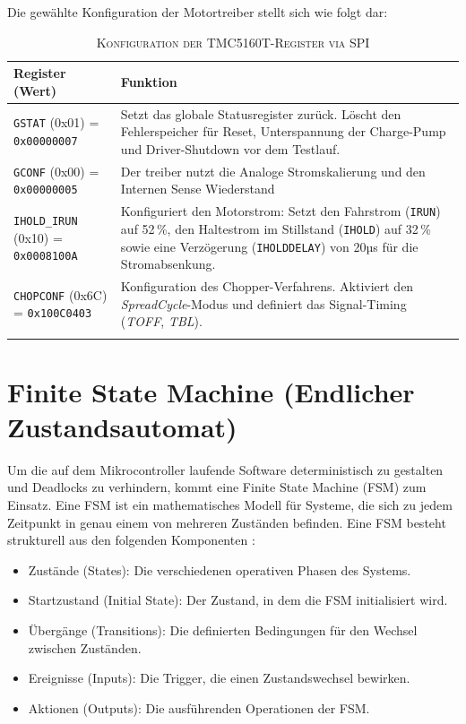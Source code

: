 Die gewählte Konfiguration der Motortreiber stellt sich wie folgt dar:

\begin{table}[htbp]
	\footnotesize 
	\centering
	\caption[Konfiguration der TMC5160T-Register via SPI]{\textsc{Konfiguration der TMC5160T-Register via SPI}}
	\label{tab:tmc5160_config}
	
	\begin{tabularx}{\linewidth}{l X}
		\toprule
		\textbf{Register (Wert)} & \textbf{Funktion} \\
		\midrule
		\texttt{GSTAT} (0x01) = \texttt{0x00000007} & Setzt das globale Statusregister zurück. Löscht den Fehlerspeicher für Reset, Unterspannung der Charge-Pump und Driver-Shutdown vor dem Testlauf. \\
		\addlinespace
		\texttt{GCONF} (0x00) = \texttt{0x00000005} & Der treiber nutzt die Analoge Stromskalierung und den Internen Sense Wiederstand \\
		\addlinespace
		\texttt{IHOLD\_IRUN} (0x10) = \texttt{0x0008100A} & Konfiguriert den Motorstrom: Setzt den Fahrstrom (\texttt{IRUN}) auf 52\,\%, den Haltestrom im Stillstand (\texttt{IHOLD}) auf 32\,\% sowie eine Verzögerung (\texttt{IHOLDDELAY}) von 20µs für die Stromabsenkung. \\
		\addlinespace
		\texttt{CHOPCONF} (0x6C) = \texttt{0x100C0403} & Konfiguration des Chopper-Verfahrens. Aktiviert den \textit{SpreadCycle}-Modus und definiert das Signal-Timing (\textit{TOFF}, \textit{TBL}). \\
		\bottomrule \cite{power}
	\end{tabularx}
\end{table}

\section{Finite State Machine (Endlicher Zustandsautomat)}
\label{subsec:fsm}

Um die auf dem Mikrocontroller laufende Software deterministisch zu gestalten und Deadlocks zu verhindern, kommt eine Finite State Machine (FSM) zum Einsatz. Eine FSM ist ein mathematisches Modell für Systeme, die sich zu jedem Zeitpunkt in genau einem von mehreren Zuständen befinden. Eine FSM besteht strukturell aus den folgenden Komponenten \cite{a2026_statemachine}:

\begin{itemize}
	\item Zustände (States): Die verschiedenen operativen Phasen des Systems.
	\item Startzustand (Initial State): Der Zustand, in dem die FSM initialisiert wird.
	\item Übergänge (Transitions): Die definierten Bedingungen für den Wechsel zwischen Zuständen.
	\item Ereignisse (Inputs): Die Trigger, die einen Zustandswechsel bewirken.
	\item Aktionen (Outputs): Die ausführenden Operationen der FSM.
\end{itemize}

